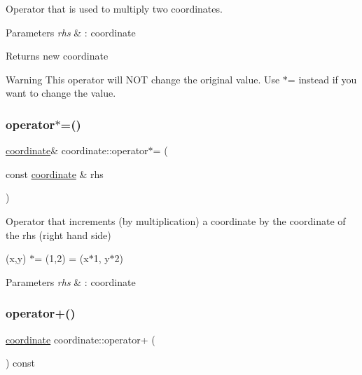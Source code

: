 Operator that is used to multiply two coordinates. 


\begin{DoxyParams}{Parameters}
{\em rhs} & \+: coordinate \\
\hline
\end{DoxyParams}
\begin{DoxyReturn}{Returns}
new coordinate 
\end{DoxyReturn}
\begin{DoxyWarning}{Warning}
This operator will N\+OT change the original value. Use $\ast$= instead if you want to change the value. 
\end{DoxyWarning}
\mbox{\label{classcoordinate_a676a8c7cc88af2315fcf14e1bfb1403e}} 
\subsubsection{\texorpdfstring{operator$\ast$=()}{operator*=()}}
{\footnotesize\ttfamily \hyperlink{classcoordinate}{coordinate}\& coordinate\+::operator$\ast$= (\begin{DoxyParamCaption}\item[{const \hyperlink{classcoordinate}{coordinate} \&}]{rhs }\end{DoxyParamCaption})\hspace{0.3cm}{\ttfamily [inline]}}



Operator that increments (by multiplication) a coordinate by the coordinate of the rhs (right hand side) 

(x,y) $\ast$= (1,2) = (x$\ast$1, y$\ast$2) 
\begin{DoxyParams}{Parameters}
{\em rhs} & \+: coordinate \\
\hline
\end{DoxyParams}
\mbox{\label{classcoordinate_ae2a84b442393f7f9aa7894b904f8ca86}} 
\subsubsection{\texorpdfstring{operator+()}{operator+()}\hspace{0.1cm}{\footnotesize\ttfamily [1/2]}}
{\footnotesize\ttfamily \hyperlink{classcoordinate}{coordinate} coordinate\+::operator+ (\begin{DoxyParamCaption}{ }\end{DoxyParamCaption}) const\hspace{0.3cm}{\ttfamily [inline]}}



